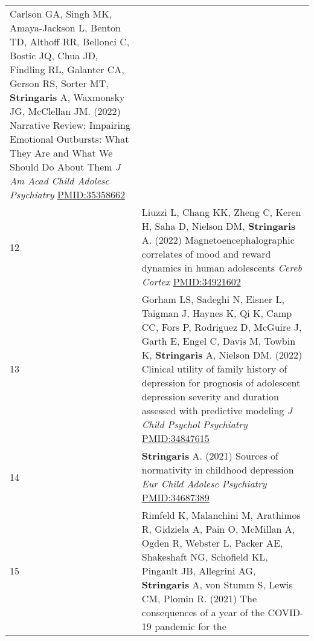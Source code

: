 \documentclass[
]{article}
\begin{document}
\begin{longtable}[]{@{}ll@{}}
\begin{minipage}[t]{0.94\columnwidth}
Carlson GA, Singh MK, Amaya-Jackson L, Benton TD, Althoff RR, Bellonci
C, Bostic JQ, Chua JD, Findling RL, Galanter CA, Gerson RS, Sorter MT,
\textbf{Stringaris} A, Waxmonsky JG, McClellan JM. (2022) Narrative
Review: Impairing Emotional Outbursts: What They Are and What We Should
Do About Them \emph{J Am Acad Child Adolesc Psychiatry}
\url{PMID:35358662}\strut
\end{minipage}\tabularnewline
\begin{minipage}[t]{0.01\columnwidth}\raggedright
12\strut
\end{minipage} & \begin{minipage}[t]{0.94\columnwidth}\raggedright
Liuzzi L, Chang KK, Zheng C, Keren H, Saha D, Nielson DM,
\textbf{Stringaris} A. (2022) Magnetoencephalographic correlates of mood
and reward dynamics in human adolescents \emph{Cereb Cortex}
\url{PMID:34921602}\strut
\end{minipage}\tabularnewline
\begin{minipage}[t]{0.01\columnwidth}\raggedright
13\strut
\end{minipage} & \begin{minipage}[t]{0.94\columnwidth}\raggedright
Gorham LS, Sadeghi N, Eisner L, Taigman J, Haynes K, Qi K, Camp CC, Fors
P, Rodriguez D, McGuire J, Garth E, Engel C, Davis M, Towbin K,
\textbf{Stringaris} A, Nielson DM. (2022) Clinical utility of family
history of depression for prognosis of adolescent depression severity
and duration assessed with predictive modeling \emph{J Child Psychol
Psychiatry} \url{PMID:34847615}\strut
\end{minipage}\tabularnewline
\begin{minipage}[t]{0.01\columnwidth}\raggedright
14\strut
\end{minipage} & \begin{minipage}[t]{0.94\columnwidth}\raggedright
\textbf{Stringaris} A. (2021) Sources of normativity in childhood
depression \emph{Eur Child Adolesc Psychiatry} \url{PMID:34687389}\strut
\end{minipage}\tabularnewline
\begin{minipage}[t]{0.01\columnwidth}\raggedright
15\strut
\end{minipage} & \begin{minipage}[t]{0.94\columnwidth}\raggedright
Rimfeld K, Malanchini M, Arathimos R, Gidziela A, Pain O, McMillan A,
Ogden R, Webster L, Packer AE, Shakeshaft NG, Schofield KL, Pingault JB,
Allegrini AG, \textbf{Stringaris} A, von Stumm S, Lewis CM, Plomin R.
(2021) The consequences of a year of the COVID-19 pandemic for the

\end{minipage}
\end{longtable}
\end{document}
